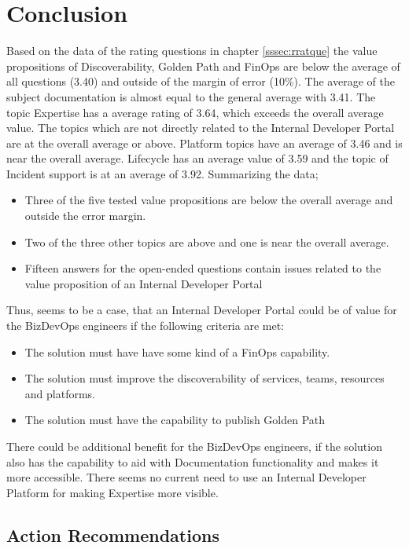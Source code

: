 \documentclass[a4paper,12pt]{article}
\begin{document}
    \section{Conclusion}
    \label{sec:conclusion}
    Based on the data of the rating questions in chapter \ref{sssec:rratque} the value propositions of Discoverability, Golden Path
    and FinOps are below the average of all questions (3.40) and outside of the margin of error (10\%).
    The average of the subject documentation is almost equal to the general average with 3.41.
    The topic Expertise has a average rating of 3.64, which exceeds the overall average value.
    The topics which are not directly related to the Internal Developer Portal are at the overall average or above.
    Platform topics have an average of 3.46 and is near the overall average.
    Lifecycle has an average value of 3.59 and the topic of Incident support is at an average of 3.92.
    Summarizing the data;
    \begin{itemize}
        \item Three of the five tested value propositions are below the overall average and outside the error margin.
        \item Two of the three other topics are above and one is near the overall average.
        \item Fifteen answers for the open-ended questions contain issues related to the value proposition of an Internal Developer Portal
    \end{itemize}
    Thus, seems to be a case, that an Internal Developer Portal could be of value for the BizDevOps engineers if the following
    criteria are met:
    \begin{itemize}
        \item The solution must have have some kind of a FinOps capability.
        \item The solution must improve the discoverability of services, teams, resources and platforms.
        \item The solution must have the capability to publish Golden Path
    \end{itemize}
    There could be additional benefit for the BizDevOps engineers, if the solution also has the capability to aid with
    Documentation functionality and makes it more accessible.
    There seems no current need to use an Internal Developer Platform for making Expertise more visible.

    \subsection{Action Recommendations}
    \label{subsec:arec}
\end{document}
